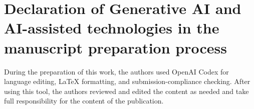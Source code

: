 \documentclass[final,5p,times,number]{elsarticle}
\begin{document}
\section*{Declaration of Generative AI and AI-assisted technologies in the manuscript preparation process}
During the preparation of this work, the authors used OpenAI Codex for language editing, LaTeX formatting, and submission-compliance checking. After using this tool, the authors reviewed and edited the content as needed and take full responsibility for the content of the publication.

\setlength{\bibsep}{-0.5pt}


\end{document}
